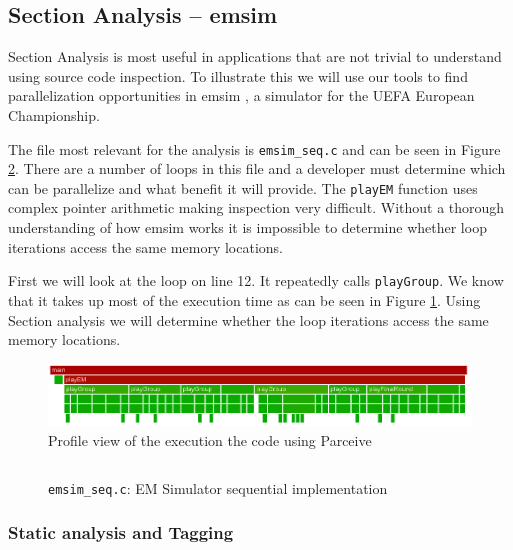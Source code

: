 \subsection {Section Analysis -- emsim}

Section Analysis is most useful in applications that are not trivial to understand using source code inspection. To illustrate this we will use our tools to find parallelization opportunities in emsim \cite{emsim}, a simulator for the UEFA European Championship.

The file most relevant for the analysis is \texttt{emsim\_seq.c} and can be seen in Figure \ref{cap4:emsim:seq}. There are a number of loops in this file and a developer must determine which can be parallelize and what benefit it will provide. The \texttt{playEM} function uses complex pointer arithmetic making inspection very difficult. Without a thorough understanding of how emsim works it is impossible to determine whether loop iterations access the same memory locations.

First we will look at the loop on line 12. It repeatedly calls \texttt{playGroup}. We know that it takes up most of the execution time as can be seen in Figure \ref{cap4:emsim:profile}. Using Section analysis we will determine whether the loop iterations access the same memory locations.

\begin{figure}[!ht]
	\centering
	\includegraphics[width=1\textwidth]{profiling}
	\caption{Profile view of the execution the code using Parceive}
	\label{cap4:emsim:profile}
\end{figure}

\begin{figure}
	\begin{center}
		\inputminted[linenos, fontsize=\scriptsize]{c}{emsim_seq.c}
	\end{center}
	\caption{\texttt{emsim\_seq.c}: EM Simulator sequential implementation}
	\label{cap4:emsim:seq}
\end{figure}

\subsubsection*{Static analysis and Tagging}



